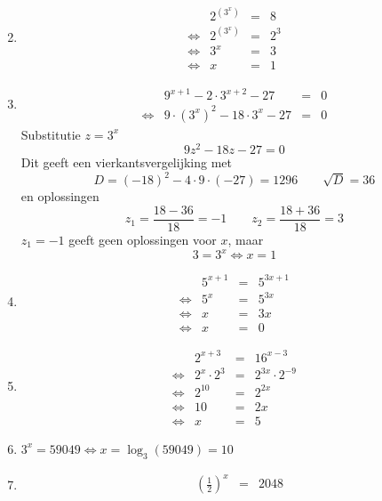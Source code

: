 \begin{oef}
\begin{opl}
\begin{enumerate}
\[        \]
  \item \[
          \begin{array}{rrclcl}
                 & 2^{(3^x)} & = & 8 \\
            \iff & 2^{(3^x)} & = & 2^3 \\
            \iff & 3^x & = & 3 \\
            \iff & x & = & 1
          \end{array}
        \]
  \item \[
          \begin{array}{rrclcl}
                 & 9^{x+1}-2 \cdot 3^{x+2}-27 & = & 0 \\
            \iff & 9 \cdot (3^x)^2 - 18 \cdot 3^x - 27 & = & 0
          \end{array}
        \]
        Substitutie $z = 3^x$
        \[
          9 z^2 - 18 z - 27 = 0
        \]
        Dit geeft een vierkantsvergelijking met
        \[
          D = (-18)^2 - 4 \cdot 9 \cdot (-27) = 1296 \qquad \sqrt{D} = 36
        \]
        en oplossingen
        \[
          z_1 = \frac{18 - 36}{18} = -1 \qquad z_2 = \frac{18 + 36}{18} = 3
        \]
        $z_1 = -1$ geeft geen oplossingen voor $x$, maar
        \[
          3 = 3^x \iff x = 1
        \]
  \item \[
          \begin{array}{rrclcl}
                 & 5^{x+1} & = & 5^{3x+1} \\
            \iff & 5^x & = & 5^{3x} \\
            \iff & x & = & 3x \\
            \iff & x & = & 0
          \end{array}
        \]
  \item \[
          \begin{array}{rrclcl}
                 & 2^{x+3} & = & 16^{x-3} \\
            \iff & 2^x \cdot 2^3 & = & 2^{3x} \cdot 2^{-9} \\
            \iff & 2^{10} & = & 2^{2x} \\
            \iff & 10 & = & 2x \\
            \iff & x & = & 5
          \end{array}
        \]
  \item $3^x=59049 \iff x = \log_3(59049) = 10$
  \item \[
          \begin{array}{rrclcl}
                 & \displaystyle \left(\frac12\right)^x & = & 2048 \\[2mm]

\end{array}\]
\end{enumerate}
\end{opl}
\end{oef}
